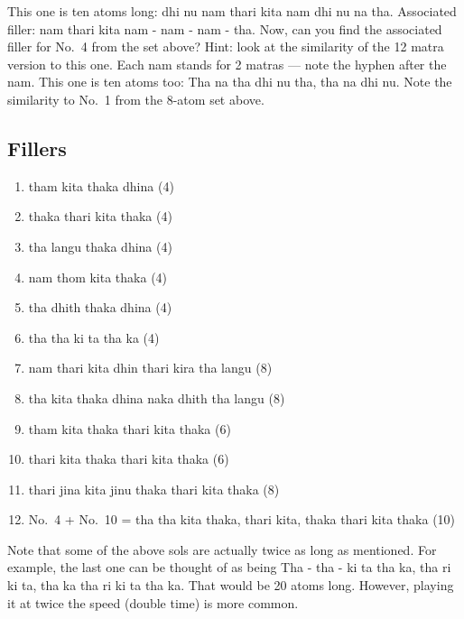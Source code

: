 This one is ten atoms long: dhi nu nam thari kita nam dhi nu na tha. Associated
filler: nam thari kita nam - nam - nam - tha. Now, can you find the associated filler
for No.~4 from the set above? Hint: look at the similarity of the 12 matra version to
this one. Each nam stands for 2 matras --- note the hyphen after the nam. This one is
ten atoms too: Tha na tha dhi nu tha, tha na dhi nu. Note the similarity to No.~1 from
the 8-atom set above.

\subsection{Fillers}

\begin{enumerate}
  \item tham kita thaka dhina (4)
  \item thaka thari kita thaka (4)
  \item tha langu thaka dhina (4)
  \item nam thom kita thaka (4)
  \item tha dhith thaka dhina (4)
  \item tha tha ki ta tha ka (4)
  \item nam thari kita dhin thari kira tha langu (8)
  \item tha kita thaka dhina naka dhith tha langu (8)
  \item tham kita thaka thari kita thaka (6)
  \item thari kita thaka thari kita thaka (6)
  \item thari jina kita jinu thaka thari kita thaka (8)
  \item No.~4 + No.~10 = tha tha kita thaka, thari kita, thaka thari kita thaka (10)
\end{enumerate}

Note that some of the above sols are actually twice as long as mentioned. For example,
the last one can be thought of as being Tha - tha - ki ta tha ka, tha ri ki ta, tha ka
tha ri ki ta tha ka. That would be 20 atoms long. However, playing it at twice the
speed (double time) is more common.
